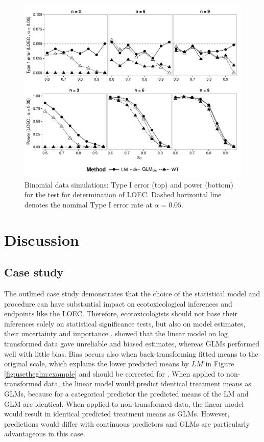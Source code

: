\begin{figure}
  \centering
  \includegraphics[width = \textwidth]{chapters/usetheglm/p_loec_p.pdf}
  \caption[Binomial data simulations: 
  Type I error (top) and power (bottom) for the test for determination of LOEC.]{
  Binomial data simulations: 
  Type I error (top) and power (bottom) for the test for determination of LOEC. 
  Dashed horizontal line denotes the nominal Type I error rate at $\alpha = 0.05$.
  }
  \label{fig:usetheglm:p_loec_p}
\end{figure}


\section{Discussion}
\label{sec:usetheglm:disc}
\subsection{Case study}
The outlined case study demonstrates that the choice of the statistical model and procedure can have substantial impact on ecotoxicological inferences and endpoints like the LOEC.
Therefore, ecotoxicologists should not base their inferences solely on statistical significance tests, but also on model estimates, their uncertainty and importance \citep{gelman_difference_2006}.
\citet{ohara_not_2010} showed that the linear model on log transformed data gave unreliable and biased estimates, whereas GLMs performed well with little bias.
Bias occurs also when back-transforming fitted means to the original scale, which explains the lower predicted means by $LM$ in Figure \ref{fig:usetheglm:example} \citep{rothery_cautionary_1988} and should be corrected for \citep{newman_regression_1993}.
When applied to non-transformed data, the linear model would predict identical treatment means as GLMs, because for a categorical predictor the predicted means of the LM and GLM are identical. 
When applied to non-transformed data, the linear model would result in identical predicted treatment means as GLMs. 
However, predictions would differ with continuous predictors and GLMs are particularly advantageous in this case.

